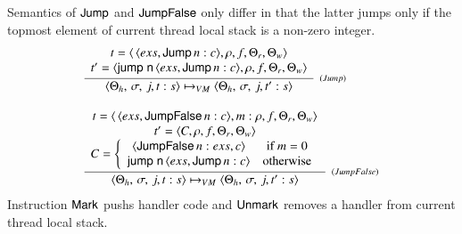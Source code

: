 \documentclass[3p,times,procedia]{elsarticle}
\theoremstyle{definition}
\newcommand{\C}[1]{\red{\mathsf{#1}}}
\newcommand{\F}[1]{\green{\mathsf{#1}}}
\newcommand{\V}[1]{\black{\mathsf{#1}}}
\begin{document}
Semantics of \ensuremath{\C{Jump}} and \ensuremath{\C{JumpFalse}} only differ in that the latter jumps only if the topmost element of current
thread local stack is a non-zero integer.
\[
  \begin{array}{l}
     \infer[_{(Jump)}]
           {\langle \Theta_h,\,\sigma,\,j,t : s\rangle \mapsto_{VM}
            \langle \Theta_h,\,\sigma,\,j,t' : s\rangle}
           {\begin{array}{c}
              t = \langle\,\langle exs, \ensuremath{\C{Jump}}\,n : c\rangle,\rho, f, \Theta_r,\Theta_w\rangle \\
              t' = \langle \ensuremath{\F{jump}\;\V{n}}\,\langle exs, \ensuremath{\C{Jump}}\,n : c\rangle, \rho, f, \Theta_r,\Theta_w\rangle
            \end{array}} \\ \\
     \infer[_{(JumpFalse)}]
           {\langle \Theta_h,\,\sigma,\,j,t : s\rangle \mapsto_{VM}
            \langle \Theta_h,\,\sigma,\,j,t' : s\rangle}
           {\begin{array}{c}
              t = \langle\,\langle exs, \ensuremath{\C{JumpFalse}}\,n : c\rangle,m:\rho, f, \Theta_r,\Theta_w\rangle \\
              t' = \langle C, \rho, f, \Theta_r,\Theta_w\rangle \\
              C = \left\{ \begin{array}{cc}
                            \langle \ensuremath{\C{JumpFalse}}\, n:exs,c\rangle & \text{if } m = 0\\
                            \ensuremath{\F{jump}\;\V{n}}\,\langle exs, \ensuremath{\C{Jump}}\,n : c\rangle & \text{otherwise}\\
                          \end{array} \right.
            \end{array}}
  \end{array}
\]
Instruction \ensuremath{\C{Mark}} pushs handler code and \ensuremath{\C{Unmark}} removes a handler from current thread local stack.
\end{document}
